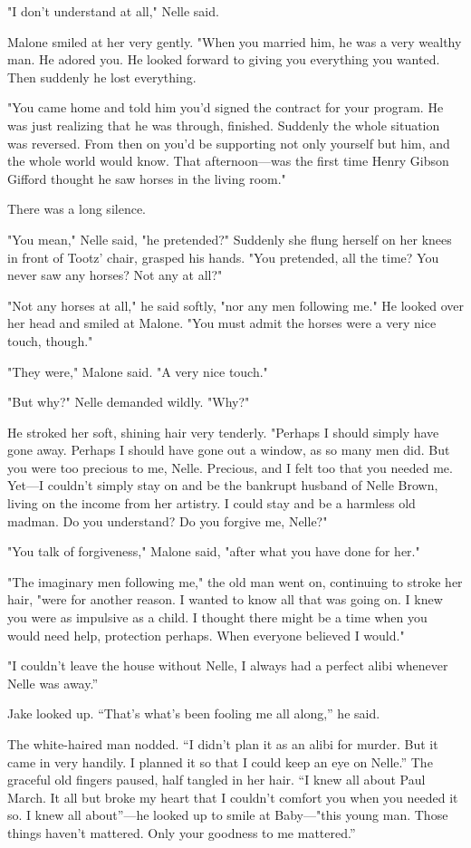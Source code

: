 \documentclass{novel}
\begin{document}
"I don’t understand at all," Nelle said.

Malone smiled at her very gently. "When you married him, he was a very wealthy man. He adored you. He looked forward to giving you everything you wanted. Then suddenly he lost everything.

"You came home and told him you’d signed the contract for your program. He was just realizing that he was through, finished. Suddenly the whole situation was reversed. From then on you’d be supporting not only yourself but him, and the whole world would know. That afternoon—was the first time Henry Gibson Gifford thought he saw horses in the living room."

There was a long silence.

"You mean," Nelle said, "he pretended?" Suddenly she flung herself on her knees in front of Tootz’ chair, grasped his hands. "You pretended, all the time? You never saw any horses? Not any at all?"

"Not any horses at all," he said softly, "nor any men following me." He looked over her head and smiled at Malone. "You must admit the horses were a very nice touch, though."

"They were," Malone said. "A very nice touch."

"But why?" Nelle demanded wildly. "Why?"

He stroked her soft, shining hair very tenderly. "Perhaps I should simply have gone away. Perhaps I should have gone out a window, as so many men did. But you were too precious to me, Nelle. Precious, and I felt too that you needed me. Yet—I couldn’t simply stay on and be the bankrupt husband of Nelle Brown, living on the income from her artistry. I could stay and be a harmless old madman. Do you understand? Do you forgive me, Nelle?"

"You talk of forgiveness," Malone said, "after what you have done for her."

"The imaginary men following me," the old man went on, continuing to stroke her hair, "were for another reason. I wanted to know all that was going on. I knew you were as impulsive as a child. I thought there might be a time when you would need help, protection perhaps. When everyone believed I would."

"I couldn't leave the house without Nelle, I always had a perfect alibi whenever Nelle was away.”

Jake looked up. “That’s what’s been fooling me all along,” he said.

The white-haired man nodded. “I didn’t plan it as an alibi for murder. But it came in very handily. I planned it so that I could keep an eye on Nelle.” The graceful old fingers paused, half tangled in her hair. “I knew all about Paul March. It all but broke my heart that I couldn’t comfort you when you needed it so. I knew all about”—he looked up to smile at Baby—"this young man. Those things haven’t mattered. Only your goodness to me mattered.”
\end{document}
